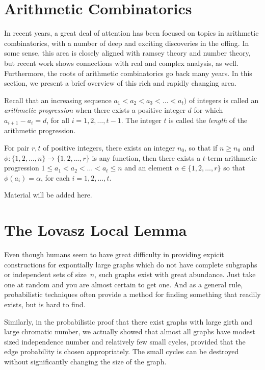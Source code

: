 \section{Arithmetic Combinatorics}\label{s:kitchensink:arithmetic-combinatorics}

In recent years, a great deal of attention has been focused on
topics in arithmetic combinatorics, with a number of deep and
exciting discoveries in the offing.  In some sense, this area
is closely aligned with ramsey theory and number theory, but recent work 
shows connections with real and complex analysis, as well.  Furthermore,
the roots of arithmetic combinatorics go back many years.  In this section, 
we present a brief overview of this rich and rapidly changing area.

Recall that an increasing sequence $a_1<a_2<a_3<\dots<a_t)$ of integers is
called an \textit{arithmetic progression} when there exists a
positive integer $d$ for which $a_{i+1}-a_i=d$, for all $i=1,2,\dots,t-1$.
The integer $t$ is called the \textit{length} of the arithmetic progression.

\begin{theorem}
For pair $r,t$ of positive integers, there exists an integer $n_0$, so that
if $n\ge n_0$ and $\phi:\{1,2,\dots,n\}\rightarrow\{1,2,\dots,r\}$ is any
function, then there exists a $t$-term arithmetic progression
$1\le a_1<a_2<\dots<a_t\le n$ and an element $\alpha\in\{1,2,\dots,r\}$
so that $\phi(a_i)=\alpha$, for each $i=1,2,\dots,t$.
\end{theorem}

Material will be added here.

\section{The Lovasz Local Lemma}\label{s:kitchensink:lovasz-local}

Even though humans seem to have great difficulty in 
providing expicit constructions for expontially large graphs 
which do not have complete subgraphs or independent sets 
of size~$n$, such graphs exist with great abundance.  Just 
take one at random and you are almost certain to get one.  And as a general
rule, probabilistic techniques often provide a method for
finding something that readily exists, but is hard to find.

Similarly, in the probabilistic proof that there exist
graphs with large girth and large chromatic number, we actually
showed that almost all graphs have modest sized independence
number and relatively few small cycles, provided that the
edge probability is chosen appropriately. The small cycles can
be destroyed without significantly changing the size of the
graph.

